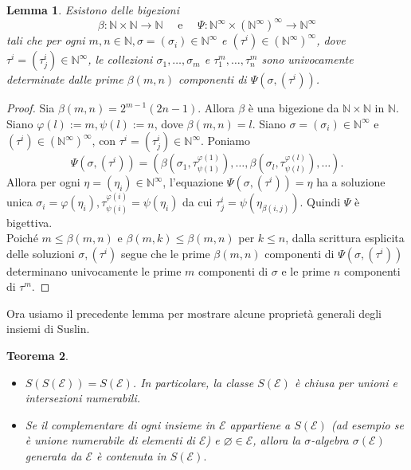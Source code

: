 \documentclass[a4paper, twoside]{article}
\newcommand{\<}{\langle}
\renewcommand{\>}{\rangle}
\newtheorem{teo}{Teorema}[]
\newtheorem{lemma}[teo]{Lemma}
\begin{document}
\begin{lemma}
	Esistono delle bigezioni
	$$	\beta: \mathbb{N} \times \mathbb{N} \rightarrow \mathbb{N} \quad \text { e } \quad \Psi: \mathbb{N}^{\infty} \times\left(\mathbb{N}^{\infty}\right)^{\infty} \rightarrow \mathbb{N}^{\infty}
	$$
	tali che per ogni $m, n \in \mathbb{N}, \sigma=\left(\sigma_{i}\right) \in \mathbb{N}^{\infty}$ e $\left(\tau^{i}\right) \in\left(\mathbb{N}^{\infty}\right)^{\infty}$, dove $\tau^{i}=\left(\tau_{j}^{i}\right) \in \mathbb{N}^{\infty}$, le collezioni $\sigma_{1}, \ldots, \sigma_{m}$ e $\tau_{1}^{m}, \ldots, \tau_{n}^{m}$ sono univocamente determinate dalle prime $\beta(m, n)$ componenti di $\Psi\left(\sigma,\left(\tau^{i}\right)\right)$.
\end{lemma}	

\begin{proof}
	Sia $\beta(m, n)=2^{m-1}(2 n-1)$. Allora $\beta$ è una bigezione da $\mathbb{N} \times \mathbb{N}$ in $\mathbb{N}$. Siano $\varphi(l):=m, \psi(l):=n$, dove $\beta(m, n)=l$. Siano $\sigma=\left(\sigma_{i}\right) \in \mathbb{N}^{\infty}$ e $\left(\tau^{i}\right) \in\left(\mathbb{N}^{\infty}\right)^{\infty}$, con $\tau^{i}=\left(\tau_{j}^{i}\right) \in \mathbb{N}^{\infty}$. Poniamo
	$$
	\Psi\left(\sigma,\left(\tau^{i}\right)\right)=\left(\beta\left(\sigma_{1}, \tau_{\psi(1)}^{\varphi(1)}\right), \ldots, \beta\left(\sigma_{l}, \tau_{\psi(l)}^{\varphi(l)}\right), \ldots\right) .
	$$
	Allora per ogni $\eta=\left(\eta_{i}\right) \in \mathbb{N}^{\infty}$, l'equazione $\Psi\left(\sigma,\left(\tau^{i}\right)\right)=\eta$ ha a soluzione unica $\sigma_{i}=\varphi\left(\eta_{i}\right),  \tau_{\psi(i)}^{\varphi(i)}=\psi(\eta_i)$ da cui $\tau_{j}^{i}=\psi\left(\eta_{\beta(i, j)}\right)$. Quindi $\Psi$ è bigettiva.\\
	Poiché $m \leq \beta(m, n)$ e $\beta(m, k) \leq \beta(m, n)$ per $k \leq n$, dalla scrittura esplicita delle soluzioni $\sigma, (\tau^i)$ segue che le prime $\beta(m, n)$ componenti di $\Psi\left(\sigma,\left(\tau^{i}\right)\right)$ determinano univocamente le prime $m$ componenti di $\sigma$ e le prime $n$ componenti di $\tau^{m}$.
	
\end{proof}

Ora usiamo il precedente lemma per mostrare alcune proprietà generali degli insiemi di Suslin.\\

\begin{teo} \label{SE}
	\hfill
	\begin{itemize}
		\item $S(S(\mathcal{E}))=S(\mathcal{E})$. In particolare, la classe $S(\mathcal{E})$ è chiusa per unioni e intersezioni numerabili.
		\item Se il complementare di ogni insieme in $\mathcal{E}$ appartiene a $S(\mathcal{E})$ (ad esempio se è unione numerabile di elementi di $\mathcal{E}$) e $\varnothing \in \mathcal{E}$, allora la $\sigma$-algebra $\sigma(\mathcal{E})$ generata da $\mathcal{E}$ è contenuta in $S(\mathcal{E}).$
	\end{itemize}
\end{teo}
\end{document}
